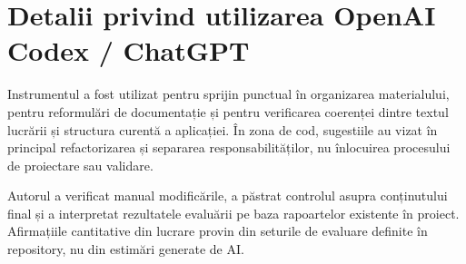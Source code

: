 \documentclass[12pt,a4paper]{report}
\theoremstyle{definition}
\theoremstyle{remark}
\begin{document}
\section{Detalii privind utilizarea OpenAI Codex / ChatGPT}
\label{sectionChatGPT}
Instrumentul a fost utilizat pentru sprijin punctual în organizarea materialului, pentru reformulări de documentație și pentru verificarea coerenței dintre textul lucrării și structura curentă a aplicației. În zona de cod, sugestiile au vizat în principal refactorizarea și separarea responsabilităților, nu înlocuirea procesului de proiectare sau validare.

Autorul a verificat manual modificările, a păstrat controlul asupra conținutului final și a interpretat rezultatele evaluării pe baza rapoartelor existente în proiect. Afirmațiile cantitative din lucrare provin din seturile de evaluare definite în repository, nu din estimări generate de AI.
\end{document}
